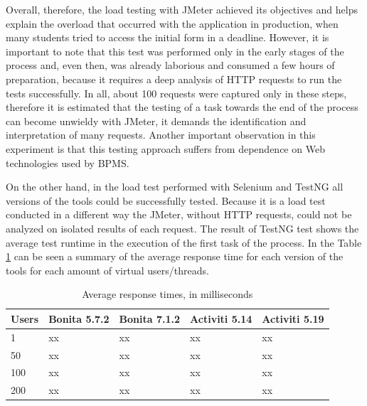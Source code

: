\documentclass[runningheads,a4paper]{llncs}
\begin{document}

Overall, therefore, the load testing with JMeter achieved its objectives and helps explain the overload that occurred with the application in production, when many students tried to access the initial form in a deadline. However, it is important to note that this test was performed only in the early stages of the process and, even then, was already laborious and consumed a few hours of preparation, because it requires a deep analysis of HTTP requests to run the tests successfully. In all, about 100 requests were captured only in these steps, therefore it is estimated that the testing of a task towards the end of the process can become unwieldy with JMeter, it demands the identification and interpretation of many requests. Another important observation in this experiment is that this testing approach suffers from dependence on Web technologies used by BPMS.

On the other hand, in the load test performed with Selenium and TestNG all versions of the tools could be successfully tested. Because it is a load test conducted in a different way the JMeter, without HTTP requests, could not be analyzed on isolated results of each request. The result of TestNG test shows the average test runtime in the execution of the first task of the process. In the Table \ref{tab:resultadoCargaSelenium} can be seen a summary of the average response time for each version of the tools for each amount of virtual users/threads.

\begin{table}
\centering
\begin{tabular}{p{2cm}|p{2cm}|p{2cm}|p{2cm}|p{2cm}}
\hline
Users & Bonita 5.7.2 & Bonita 7.1.2 & Activiti 5.14 & Activiti 5.19 \\\hline
1 & xx & xx & xx & xx \\\hline
50 & xx & xx & xx & xx \\\hline
100 & xx & xx & xx & xx \\\hline
200 & xx & xx & xx & xx \\\hline
\end{tabular}
\caption{Average response times, in milliseconds}
\label{tab:resultadoCargaSelenium}
\end{table}
\end{document}
